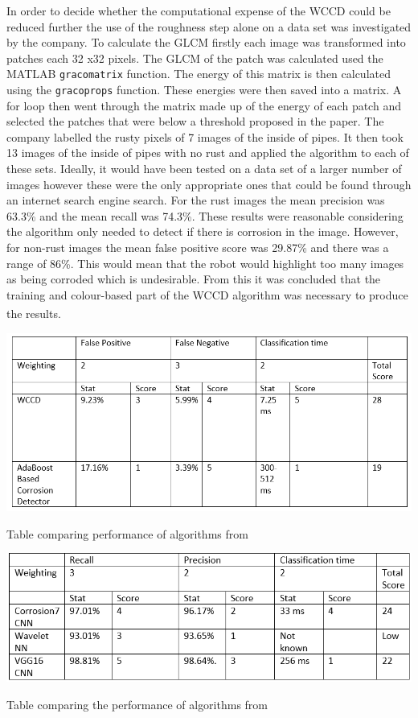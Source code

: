 \documentclass[11pt]{article}		%
\newlength{\imageheight}	 %
\newcommand{\supercite}[1]{\textsuperscript{\cite{#1}}}		%
\begin{document}
	        In order to decide whether the computational expense of the WCCD could be reduced further the use of the roughness step alone on a data set was investigated by the company. To calculate the GLCM firstly each image was transformed into patches each 32 x32 pixels. The GLCM of the patch was calculated used the MATLAB \verb|gracomatrix| function. The energy of this matrix is then calculated using the \verb|gracoprops| function. These energies were then saved into a matrix. A for loop then went through the matrix made up of the energy of each patch and selected the patches that were below a threshold proposed in the paper. The company labelled the rusty pixels of 7 images of the inside of pipes. It then took 13 images of the inside of pipes with no rust and applied the algorithm to each of these sets. Ideally, it would have been tested on a data set of a larger number of images however these were the only appropriate ones that could be found through an internet search engine search. For the rust images the mean precision was 63.3\% and the mean recall was 74.3\%. These results were reasonable considering the algorithm only needed to detect if there is corrosion in the image. However, for non-rust images the mean false positive score was 29.87\% and there was a range of 86\%. This would mean that the robot would highlight too many images as being corroded which is undesirable. From this it was concluded that the training and colour-based part of the WCCD algorithm was necessary to produce the results.\supercite{WCCD}  

			\begin{table}[h]
				\centering
				\includegraphics[height=\imageheight]{Table_comparing_WCCD_AdaBoost_corrosion.PNG}
				\caption{Table comparing performance of algorithms from \cite{WCCD}}
				\label{WCCD_comparison}
			\end{table}

			\begin{table}[h]
				\centering
				\includegraphics[height=\imageheight]{Table_comparing_CNN_WNN_corrosion.PNG}
				\caption{Table comparing the performance of algorithms from \cite{Corrosion7}}
				\label{CNN_comparison}
			\end{table}
\end{document}
